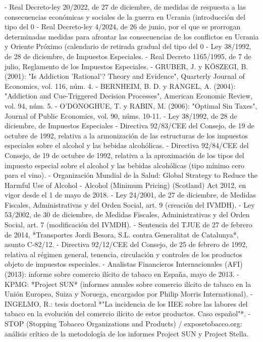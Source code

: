 \documentclass[10pt,a4paper]{article}
\begin{document}
- Real Decreto-ley 20/2022, de 27 de diciembre, de medidas de respuesta a las consecuencias económicas y sociales de la guerra en Ucrania (introducción del tipo del 0%
- Real Decreto-ley 4/2024, de 26 de junio, por el que se prorrogan determinadas medidas para afrontar las consecuencias de los conflictos en Ucrania y Oriente Próximo (calendario de retirada gradual del tipo del 0%
- Ley 38/1992, de 28 de diciembre, de Impuestos Especiales.
- Real Decreto 1165/1995, de 7 de julio, Reglamento de los Impuestos Especiales.
- GRUBER, J. y KÖSZEGI, B. (2001): "Is Addiction 'Rational'? Theory and Evidence", Quarterly Journal of Economics, vol. 116, núm. 4.
- BERNHEIM, B. D. y RANGEL, A. (2004): "Addiction and Cue-Triggered Decision Processes", American Economic Review, vol. 94, núm. 5.
- O'DONOGHUE, T. y RABIN, M. (2006): "Optimal Sin Taxes", Journal of Public Economics, vol. 90, núms. 10-11.
- Ley 38/1992, de 28 de diciembre, de Impuestos Especiales
- Directiva 92/83/CEE del Consejo, de 19 de octubre de 1992, relativa a la armonización de las estructuras de los impuestos especiales sobre el alcohol y las bebidas alcohólicas.
- Directiva 92/84/CEE del Consejo, de 19 de octubre de 1992, relativa a la aproximación de los tipos del impuesto especial sobre el alcohol y las bebidas alcohólicas (tipo mínimo cero para el vino).
- Organización Mundial de la Salud: Global Strategy to Reduce the Harmful Use of Alcohol
- Alcohol (Minimum Pricing) (Scotland) Act 2012, en vigor desde el 1 de mayo de 2018.
- Ley 24/2001, de 27 de diciembre, de Medidas Fiscales, Administrativas y del Orden Social, art. 9 (creación del IVMDH).
- Ley 53/2002, de 30 de diciembre, de Medidas Fiscales, Administrativas y del Orden Social, art. 7 (modificación del IVMDH).
- Sentencia del TJUE de 27 de febrero de 2014, *Transportes Jordi Besora, S.L. contra Generalitat de Catalunya*, asunto C-82/12.
- Directiva 92/12/CEE del Consejo, de 25 de febrero de 1992, relativa al régimen general, tenencia, circulación y controles de los productos objeto de impuestos especiales.
- Analistas Financieros Internacionales (AFI) (2013): informe sobre comercio ilícito de tabaco en España, mayo de 2013.
- KPMG: *Project SUN* (informes anuales sobre comercio ilícito de tabaco en la Unión Europea, Suiza y Noruega, encargados por Philip Morris International).
- INGELMO, R.: tesis doctoral *"La incidencia de los IIEE sobre las labores del tabaco en la evolución del comercio ilícito de estos productos. Caso español"*.
- STOP (Stopping Tobacco Organizations and Products) / exposetobacco.org: análisis crítico de la metodología de los informes Project SUN y Project Stella.
\end{document}
